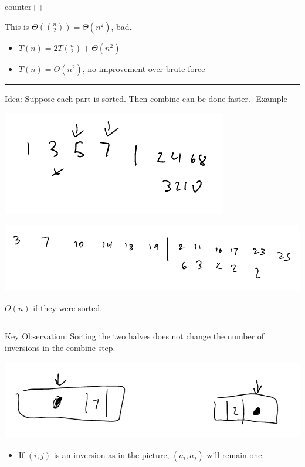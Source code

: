 \documentclass[11pt]{article}
\begin{document}
\begin{algorithmic}
		 counter++
		\EndIf
	\EndFor
\EndFor
\end{algorithmic}
This is \(\Theta(\left(\frac{n}{2}\right)) = \Theta(n^2)\), bad.

\begin{itemize}
\item \(T(n)=2T(\frac{n}{2})+\Theta(n^2)\)
\item \(T(n)=\Theta(n^2)\), no improvement over brute force
\end{itemize}

\noindent\rule{\textwidth}{0.5pt}
Idea: Suppose each part is sorted. Then combine can be done faster. 
-Example
\begin{center}
\includegraphics[width=.9\linewidth]{./Images/i72.png}
\end{center}
\begin{center}
\includegraphics[width=.9\linewidth]{./Images/i73.png}
\end{center}
\(O(n)\) if they were sorted.

\noindent\rule{\textwidth}{0.5pt}
Key Observation: Sorting the two halves does not change the number of inversions in the combine step.
\begin{center}
\includegraphics[width=.9\linewidth]{./Images/i74.png}
\end{center}
\begin{itemize}
\item If \((i,j)\) is an inversion as in the picture, \((a_i, a_j)\) will remain one.
\end{itemize}
\end{document}
